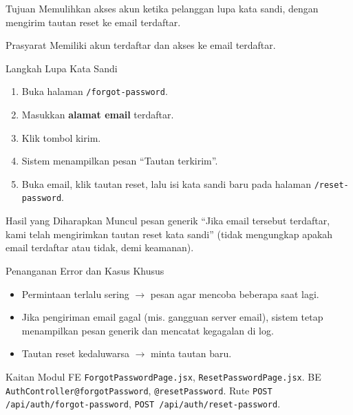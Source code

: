 
\begin{flowsection}{Tujuan}
Memulihkan akses akun ketika pelanggan lupa kata sandi, dengan mengirim tautan
reset ke email terdaftar.
\end{flowsection}

\begin{flowsection}{Prasyarat}
Memiliki akun terdaftar dan akses ke email terdaftar.
\end{flowsection}

\begin{flowsection}{Langkah Lupa Kata Sandi}
\begin{enumerate}
  \item Buka halaman \texttt{/forgot-password}.
  \item Masukkan \textbf{alamat email} terdaftar.
  \item Klik tombol kirim.
  \item Sistem menampilkan pesan ``Tautan terkirim''.
  \item Buka email, klik tautan reset, lalu isi kata sandi baru pada halaman
        \texttt{/reset-password}.
\end{enumerate}
\end{flowsection}


\begin{flowsection}{Hasil yang Diharapkan}
Muncul pesan generik ``Jika email tersebut terdaftar, kami telah mengirimkan
tautan reset kata sandi'' (tidak mengungkap apakah email terdaftar atau tidak,
demi keamanan).
\end{flowsection}


\begin{flowsection}{Penanganan Error dan Kasus Khusus}
\begin{itemize}
  \item Permintaan terlalu sering $\rightarrow$ pesan agar mencoba beberapa saat lagi.
  \item Jika pengiriman email gagal (mis. gangguan server email), sistem tetap
        menampilkan pesan generik dan mencatat kegagalan di log.
  \item Tautan reset kedaluwarsa $\rightarrow$ minta tautan baru.
\end{itemize}
\end{flowsection}

\begin{flowsection}{Kaitan Modul}
FE \texttt{ForgotPasswordPage.jsx}, \texttt{ResetPasswordPage.jsx}. BE
\texttt{AuthController@forgotPassword}, \texttt{@resetPassword}. Rute
\texttt{POST /api/auth/forgot-password}, \texttt{POST /api/auth/reset-password}.
\end{flowsection}


